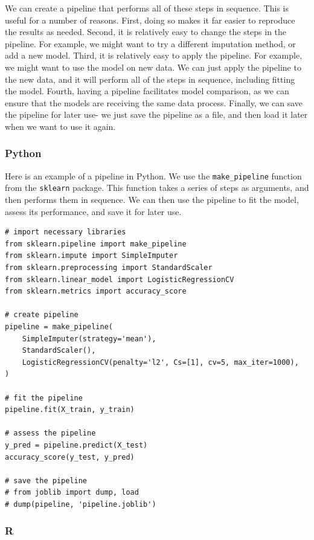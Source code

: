 \documentclass[
  letterpaper,
]{krantz}
\begin{document}
We can create a pipeline that performs all of these steps in sequence.
This is useful for a number of reasons. First, doing so makes it far
easier to reproduce the results as needed. Second, it is relatively easy
to change the steps in the pipeline. For example, we might want to try a
different imputation method, or add a new model. Third, it is relatively
easy to apply the pipeline. For example, we might want to use the model
on new data. We can just apply the pipeline to the new data, and it will
perform all of the steps in sequence, including fitting the model.
Fourth, having a pipeline facilitates model comparison, as we can ensure
that the models are receiving the same data process. Finally, we can
save the pipeline for later use- we just save the pipeline as a file,
and then load it later when we want to use it again.

\subsubsection{Python}

Here is an example of a pipeline in Python. We use the
\texttt{make\_pipeline} function from the \texttt{sklearn} package. This
function takes a series of steps as arguments, and then performs them in
sequence. We can then use the pipeline to fit the model, assess its
performance, and save it for later use.

\begin{verbatim}
# import necessary libraries
from sklearn.pipeline import make_pipeline
from sklearn.impute import SimpleImputer
from sklearn.preprocessing import StandardScaler
from sklearn.linear_model import LogisticRegressionCV
from sklearn.metrics import accuracy_score

# create pipeline
pipeline = make_pipeline(
    SimpleImputer(strategy='mean'),
    StandardScaler(),
    LogisticRegressionCV(penalty='l2', Cs=[1], cv=5, max_iter=1000),
)

# fit the pipeline
pipeline.fit(X_train, y_train)

# assess the pipeline
y_pred = pipeline.predict(X_test)
accuracy_score(y_test, y_pred)

# save the pipeline
# from joblib import dump, load
# dump(pipeline, 'pipeline.joblib')
\end{verbatim}

\subsubsection{R}
\end{document}

